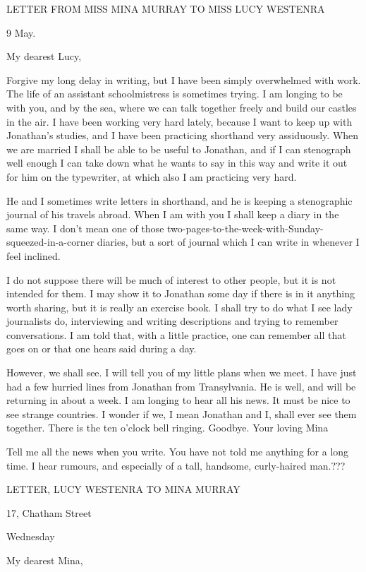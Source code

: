 LETTER FROM MISS MINA MURRAY TO MISS LUCY WESTENRA 

9 May. 

My dearest Lucy, 

Forgive my long delay in writing, but I have been simply overwhelmed with work. The life of an assistant schoolmistress is sometimes trying. I am longing to be with you, and by the sea, where we can talk together freely and build our castles in the air. I have been working very hard lately, because I want to keep up with Jonathan's studies, and I have been practicing shorthand very assiduously. When we are married I shall be able to be useful to Jonathan, and if I can stenograph well enough I can take down what he wants to say in this way and write it out for him on the typewriter, at which also I am practicing very hard. 

He and I sometimes write letters in shorthand, and he is keeping a stenographic journal of his travels abroad. When I am with you I shall keep a diary in the same way. I don't mean one of those two-pages-to-the-week-with-Sunday-squeezed-in-a-corner diaries, but a sort of journal which I can write in whenever I feel inclined. 

I do not suppose there will be much of interest to other people, but it is not intended for them. I may show it to Jonathan some day if there is in it anything worth sharing, but it is really an exercise book. I shall try to do what I see lady journalists do, interviewing and writing descriptions and trying to remember conversations. I am told that, with a little practice, one can remember all that goes on or that one hears said during a day. 

However, we shall see. I will tell you of my little plans when we meet. I have just had a few hurried lines from Jonathan from Transylvania. He is well, and will be returning in about a week. I am longing to hear all his news. It must be nice to see strange countries. I wonder if we, I mean Jonathan and I, shall ever see them together. There is the ten o'clock bell ringing. Goodbye. Your loving Mina 

Tell me all the news when you write. You have not told me anything for a long time. I hear rumours, and especially of a tall, handsome, curly-haired man.??? 

LETTER, LUCY WESTENRA TO MINA MURRAY 

17, Chatham Street 

Wednesday 

My dearest Mina, 

